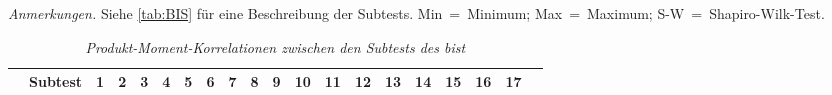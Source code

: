 \documentclass[11pt, twoside, a4paper]{book}		%
\begin{document}
\begin{table}[htbp]
\begin{threeparttable}
\begin{tabular}
			\hline
		\end{tabular}

		\begin{tablenotes}[flushleft]
			\footnotesize				%
			\setlength{}	%
			\item \textit{Anmerkungen.} Siehe \autoref{tab:BIS} für eine Beschreibung der Subtests.
			Min~=~Minimum; Max~=~Maximum; S-W~=~Shapiro-Wilk-Test.
		\end{tablenotes}
	\end{threeparttable}
\end{table}




\begin{sidewaystable}
	
	\begin{adjustbox}{width=1\textwidth,totalheight=1\textheight,keepaspectratio}
		
		\begin{threeparttable}
			\captionsetup{labelsep = none}
			\caption[Zusammenhänge zwischen den Subtests]{\newline  \textit{Produkt-Moment-Korrelationen zwischen den Subtests des \gls{bist}} \vspace{.2cm}}
			\label{tab:product_correlations_BIS}

		\begin{tabular}{
				c
				c
				S[table-format = 0.2, add-integer-zero=false]
				S[table-format = 0.2, add-integer-zero=false]
				S[table-format = 0.2, add-integer-zero=false]
				S[table-format = 0.2, add-integer-zero=false]
				S[table-format = 0.2, add-integer-zero=false]
				S[table-format = 0.2, add-integer-zero=false]
				S[table-format = 0.2, add-integer-zero=false]
				S[table-format = 0.2, add-integer-zero=false]
				S[table-format = 0.2, add-integer-zero=false]
				S[table-format = 0.2, add-integer-zero=false]
				S[table-format = 0.2, add-integer-zero=false]
				S[table-format = 0.2, add-integer-zero=false]
				S[table-format = 0.2, add-integer-zero=false]
				S[table-format = 0.2, add-integer-zero=false]
				S[table-format = 0.2, add-integer-zero=false]
				S[table-format = 0.2, add-integer-zero=false]
				S[table-format = 0.2, add-integer-zero=false]
				>{\centering\arraybackslash}p{1.2cm}
			}
			\hline
			&	{Subtest}	&	{1}	&	{2}	&	{3}	&	{4}	&	{5}	&	{6}	&	{7}	&	{8}	&	{9}	&	{10}&	{11}&	{12}&	{13}&	{14}&	{15}&	{16}&	{17}	\\
			\hline
			

\end{tabular}
\end{threeparttable}
\end{adjustbox}
\end{sidewaystable}
\end{document}
